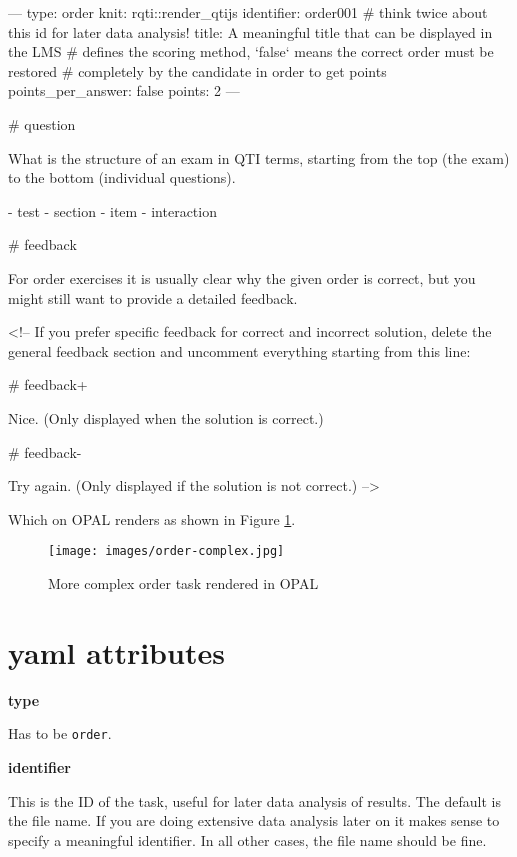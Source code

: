 \documentclass[twoside]{tufte-book}
\newenvironment{Shaded}{}{}
\begin{document}
\begin{Shaded}
\begin{Highlighting}
---
type: order
knit: rqti::render_qtijs
identifier: order001 # think twice about this id for later data analysis!
title: A meaningful title that can be displayed in the LMS
# defines the scoring method, `false` means the correct order must be restored
# completely by the candidate in order to get points
points_per_answer: false
points: 2
---

# question

What is the structure of an exam in QTI terms, starting from the top (the exam)
to the bottom (individual questions).

- test
- section
- item
- interaction

# feedback

For order exercises it is usually clear why the given order is correct, but you
might still want to provide a detailed feedback.

<!-- If you prefer specific feedback for correct and incorrect solution, delete
the general feedback section and uncomment everything starting from this line:

# feedback+

Nice. (Only displayed when the solution is correct.)

# feedback-

Try again. (Only displayed if the solution is not correct.)
-->
\end{Highlighting}
\end{Shaded}

Which on OPAL renders as shown in Figure \ref{order2opal}.

\begin{figure}
\centering
\texttt{[image: images/order-complex.jpg]}
\caption{\label{order2opal}More complex order task rendered in OPAL}
\end{figure}

\section{yaml attributes}\label{yaml-attributes-5}

\noindent\textbf{type}\label{type-5}

Has to be \texttt{order}.

\noindent\textbf{identifier}\label{identifier-5}

This is the ID of the task, useful for later data analysis of results. The default is the file name. If you are doing extensive data analysis later on it makes sense to
specify a meaningful identifier. In all other cases, the file name should be
fine.
\end{document}
